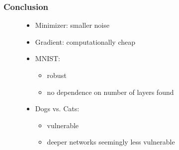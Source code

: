 \documentclass[handout]{beamer}
\begin{document}
\begin{frame}
\frametitle{Conclusion} 
\begin{figure}

\begin{itemize}
\item Minimizer: smaller noise
\item Gradient: computationally cheap
\end{itemize}
\hspace{2em}
\begin{itemize}
\item MNIST: 
\begin{itemize}
\item robust
\item no dependence on number of layers found
\end{itemize}
\item Dogs vs. Cats: 
\begin{itemize}
\item vulnerable
\item deeper networks seemingly less vulnerable
\end{itemize} 
\end{itemize}
\end{figure}
\end{frame}
\end{document}
